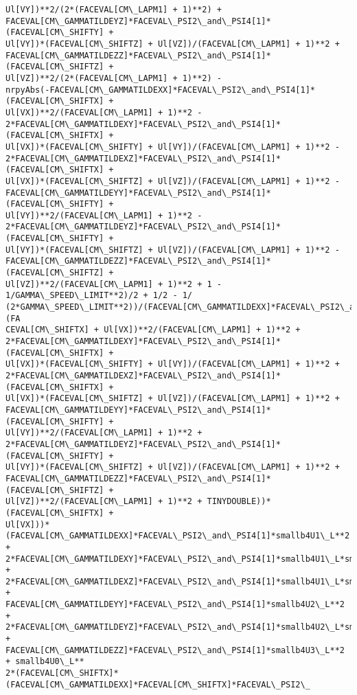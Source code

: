 \documentclass[landscape,letterpaper,10pt,english]{article}
\begin{document}
\begin{Verbatim}[commandchars=\\\{\}]
Ul[VY])**2/(2*(FACEVAL[CM\_LAPM1] + 1)**2) +
FACEVAL[CM\_GAMMATILDEYZ]*FACEVAL\_PSI2\_and\_PSI4[1]*(FACEVAL[CM\_SHIFTY] +
Ul[VY])*(FACEVAL[CM\_SHIFTZ] + Ul[VZ])/(FACEVAL[CM\_LAPM1] + 1)**2 +
FACEVAL[CM\_GAMMATILDEZZ]*FACEVAL\_PSI2\_and\_PSI4[1]*(FACEVAL[CM\_SHIFTZ] +
Ul[VZ])**2/(2*(FACEVAL[CM\_LAPM1] + 1)**2) -
nrpyAbs(-FACEVAL[CM\_GAMMATILDEXX]*FACEVAL\_PSI2\_and\_PSI4[1]*(FACEVAL[CM\_SHIFTX] +
Ul[VX])**2/(FACEVAL[CM\_LAPM1] + 1)**2 -
2*FACEVAL[CM\_GAMMATILDEXY]*FACEVAL\_PSI2\_and\_PSI4[1]*(FACEVAL[CM\_SHIFTX] +
Ul[VX])*(FACEVAL[CM\_SHIFTY] + Ul[VY])/(FACEVAL[CM\_LAPM1] + 1)**2 -
2*FACEVAL[CM\_GAMMATILDEXZ]*FACEVAL\_PSI2\_and\_PSI4[1]*(FACEVAL[CM\_SHIFTX] +
Ul[VX])*(FACEVAL[CM\_SHIFTZ] + Ul[VZ])/(FACEVAL[CM\_LAPM1] + 1)**2 -
FACEVAL[CM\_GAMMATILDEYY]*FACEVAL\_PSI2\_and\_PSI4[1]*(FACEVAL[CM\_SHIFTY] +
Ul[VY])**2/(FACEVAL[CM\_LAPM1] + 1)**2 -
2*FACEVAL[CM\_GAMMATILDEYZ]*FACEVAL\_PSI2\_and\_PSI4[1]*(FACEVAL[CM\_SHIFTY] +
Ul[VY])*(FACEVAL[CM\_SHIFTZ] + Ul[VZ])/(FACEVAL[CM\_LAPM1] + 1)**2 -
FACEVAL[CM\_GAMMATILDEZZ]*FACEVAL\_PSI2\_and\_PSI4[1]*(FACEVAL[CM\_SHIFTZ] +
Ul[VZ])**2/(FACEVAL[CM\_LAPM1] + 1)**2 + 1 - 1/GAMMA\_SPEED\_LIMIT**2)/2 + 1/2 - 1/
(2*GAMMA\_SPEED\_LIMIT**2))/(FACEVAL[CM\_GAMMATILDEXX]*FACEVAL\_PSI2\_and\_PSI4[1]*(FA
CEVAL[CM\_SHIFTX] + Ul[VX])**2/(FACEVAL[CM\_LAPM1] + 1)**2 +
2*FACEVAL[CM\_GAMMATILDEXY]*FACEVAL\_PSI2\_and\_PSI4[1]*(FACEVAL[CM\_SHIFTX] +
Ul[VX])*(FACEVAL[CM\_SHIFTY] + Ul[VY])/(FACEVAL[CM\_LAPM1] + 1)**2 +
2*FACEVAL[CM\_GAMMATILDEXZ]*FACEVAL\_PSI2\_and\_PSI4[1]*(FACEVAL[CM\_SHIFTX] +
Ul[VX])*(FACEVAL[CM\_SHIFTZ] + Ul[VZ])/(FACEVAL[CM\_LAPM1] + 1)**2 +
FACEVAL[CM\_GAMMATILDEYY]*FACEVAL\_PSI2\_and\_PSI4[1]*(FACEVAL[CM\_SHIFTY] +
Ul[VY])**2/(FACEVAL[CM\_LAPM1] + 1)**2 +
2*FACEVAL[CM\_GAMMATILDEYZ]*FACEVAL\_PSI2\_and\_PSI4[1]*(FACEVAL[CM\_SHIFTY] +
Ul[VY])*(FACEVAL[CM\_SHIFTZ] + Ul[VZ])/(FACEVAL[CM\_LAPM1] + 1)**2 +
FACEVAL[CM\_GAMMATILDEZZ]*FACEVAL\_PSI2\_and\_PSI4[1]*(FACEVAL[CM\_SHIFTZ] +
Ul[VZ])**2/(FACEVAL[CM\_LAPM1] + 1)**2 + TINYDOUBLE))*(FACEVAL[CM\_SHIFTX] +
Ul[VX]))*(FACEVAL[CM\_GAMMATILDEXX]*FACEVAL\_PSI2\_and\_PSI4[1]*smallb4U1\_L**2 +
2*FACEVAL[CM\_GAMMATILDEXY]*FACEVAL\_PSI2\_and\_PSI4[1]*smallb4U1\_L*smallb4U2\_L +
2*FACEVAL[CM\_GAMMATILDEXZ]*FACEVAL\_PSI2\_and\_PSI4[1]*smallb4U1\_L*smallb4U3\_L +
FACEVAL[CM\_GAMMATILDEYY]*FACEVAL\_PSI2\_and\_PSI4[1]*smallb4U2\_L**2 +
2*FACEVAL[CM\_GAMMATILDEYZ]*FACEVAL\_PSI2\_and\_PSI4[1]*smallb4U2\_L*smallb4U3\_L +
FACEVAL[CM\_GAMMATILDEZZ]*FACEVAL\_PSI2\_and\_PSI4[1]*smallb4U3\_L**2 + smallb4U0\_L**
2*(FACEVAL[CM\_SHIFTX]*(FACEVAL[CM\_GAMMATILDEXX]*FACEVAL[CM\_SHIFTX]*FACEVAL\_PSI2\_

\end{Verbatim}
\end{document}
